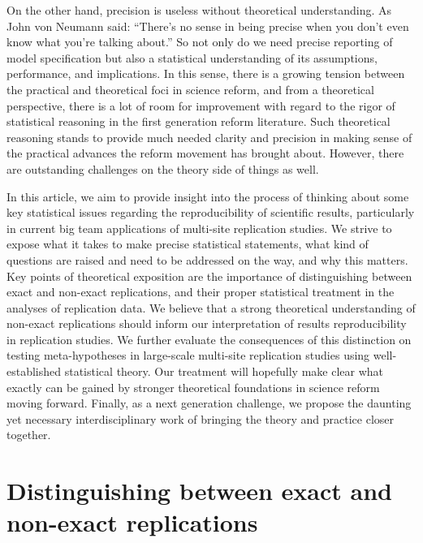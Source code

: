 \documentclass[meta,authordate]{jote-new-article}
\newcounter{result}
\begin{document}
On the other hand, precision is useless without theoretical understanding. As John von Neumann said: ``There's no sense in being precise when you don't even know what you're talking about.'' So not only do we need precise reporting of model specification but also a statistical understanding of its assumptions, performance, and implications. In this sense, there is a growing tension between the practical and theoretical foci in science reform, and from a theoretical perspective, there is a lot of room for improvement with regard to the rigor of statistical reasoning in the first generation reform literature. Such theoretical reasoning stands to provide much needed clarity and precision in making sense of the practical advances the reform movement has brought about. However, there are outstanding challenges on the theory side of things as well.

In this article, we aim to provide insight into the process of thinking about some key statistical issues regarding the reproducibility of scientific results, particularly in current big team applications of multi-site replication studies. We strive to expose what it takes to make precise statistical statements, what kind of questions are raised and need to be addressed on the way, and why this matters. Key points of theoretical exposition are the importance of distinguishing between exact and non-exact replications, and their proper statistical treatment in the analyses of replication data. We believe that a strong theoretical understanding of non-exact replications should inform our interpretation of results reproducibility in replication studies. We further evaluate the consequences of this distinction on testing meta-hypotheses in large-scale multi-site replication studies using well-established statistical theory. Our treatment will hopefully make clear what exactly can be gained by stronger theoretical foundations in science reform moving forward. Finally, as a next generation challenge, we propose the daunting yet necessary interdisciplinary work of bringing the theory and practice closer together.

\section{Distinguishing between exact and non-exact replications}
\end{document}
